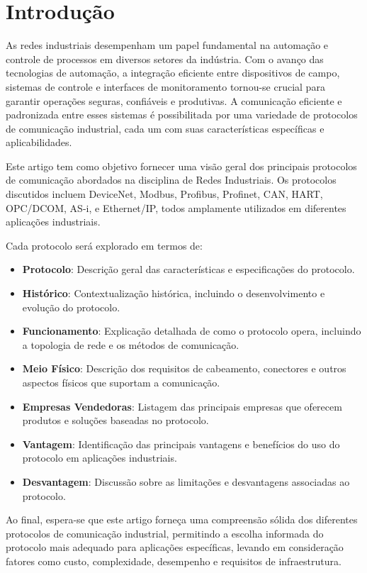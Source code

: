 \documentclass[a4paper,11pt]{article} %
\begin{document}
\section{Introdução}

As redes industriais desempenham um papel fundamental na automação e controle de processos em diversos setores da indústria. Com o avanço das tecnologias de automação, a integração eficiente entre dispositivos de campo, sistemas de controle e interfaces de monitoramento tornou-se crucial para garantir operações seguras, confiáveis e produtivas. A comunicação eficiente e padronizada entre esses sistemas é possibilitada por uma variedade de protocolos de comunicação industrial, cada um com suas características específicas e aplicabilidades.

Este artigo tem como objetivo fornecer uma visão geral dos principais protocolos de comunicação abordados na disciplina de Redes Industriais. Os protocolos discutidos incluem DeviceNet, Modbus, Profibus, Profinet, CAN, HART, OPC/DCOM, AS-i, e Ethernet/IP, todos amplamente utilizados em diferentes aplicações industriais.

Cada protocolo será explorado em termos de:
\begin{itemize}
    \item \textbf{Protocolo}: Descrição geral das características e especificações do protocolo.
    \item \textbf{Histórico}: Contextualização histórica, incluindo o desenvolvimento e evolução do protocolo.
    \item \textbf{Funcionamento}: Explicação detalhada de como o protocolo opera, incluindo a topologia de rede e os métodos de comunicação.
    \item \textbf{Meio Físico}: Descrição dos requisitos de cabeamento, conectores e outros aspectos físicos que suportam a comunicação.
    \item \textbf{Empresas Vendedoras}: Listagem das principais empresas que oferecem produtos e soluções baseadas no protocolo.
    \item \textbf{Vantagem}: Identificação das principais vantagens e benefícios do uso do protocolo em aplicações industriais.
    \item \textbf{Desvantagem}: Discussão sobre as limitações e desvantagens associadas ao protocolo.
\end{itemize}

Ao final, espera-se que este artigo forneça uma compreensão sólida dos diferentes protocolos de comunicação industrial, permitindo a escolha informada do protocolo mais adequado para aplicações específicas, levando em consideração fatores como custo, complexidade, desempenho e requisitos de infraestrutura.
\end{document}
